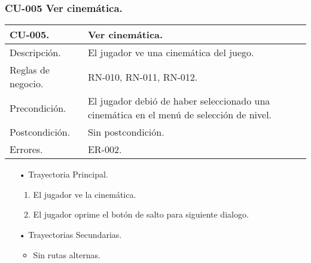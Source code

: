 \subsubsection{CU-005 Ver cinemática.} \label{CU:05}
\begin{longtable}[c]{ | m{5cm} | m{10cm}|} 
		\hline
		\rowcolor{cyan}CU-005. & Ver cinemática.\\ 
		\hline
		Descripción. & El jugador ve una cinemática del juego.\\ 
		\hline
		Reglas de negocio. & RN-010, RN-011, RN-012.\\ 
		\hline
		Precondición. & El jugador debió de haber seleccionado una cinemática en el menú de selección de nivel.\\
		\hline
		Postcondición. & Sin postcondición.\\
		\hline
		Errores. & ER-002.\\
		\hline
\end{longtable}
\begin{itemize}
	\item[•] Trayectoria Principal.
		\begin{enumerate}
			\item El jugador ve la cinemática.
			\item El jugador oprime el botón de salto para siguiente dialogo.
		\end{enumerate}
	\item[•] Trayectorias Secundarias.
		\begin{itemize}
			\item Sin rutas alternas.
		\end{itemize}
\end{itemize}